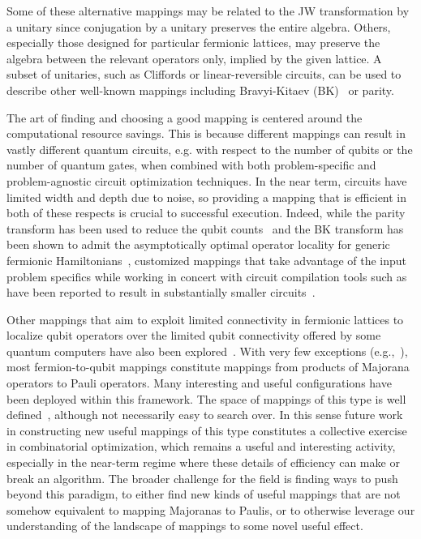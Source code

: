 Some of these alternative mappings may be related to the JW transformation by a unitary since conjugation by a unitary preserves the entire algebra. Others, especially those designed for particular fermionic lattices, may preserve the algebra between the relevant operators only, implied by the given lattice.
A subset of unitaries, such as Cliffords or linear-reversible circuits, can be used to describe other well-known mappings including Bravyi-Kitaev (BK)~\cite{bravyi2002fermionic} or parity. 


The art of finding and choosing a good mapping is centered around the computational resource savings.
This is because different mappings can result in vastly different quantum circuits, e.g. with respect to the number of qubits or the number of quantum gates, when combined with both problem-specific and problem-agnostic circuit optimization techniques.
In the near term, circuits have limited width and depth due to noise, so providing a mapping that is efficient in both of these respects is crucial to successful execution.
Indeed, while the parity transform has been used to reduce the qubit counts~\cite{bravyi2017tapering} and the BK transform has been shown to admit the asymptotically optimal operator locality for generic fermionic Hamiltonians~\cite{bravyi2002fermionic}, customized mappings that take advantage of the input problem specifics while working in concert with circuit compilation tools such as~\cite{nam2018automated,nam2020trappedion} have been reported to result in substantially smaller circuits~\cite{wang2021resource,wang2023ever}.

Other mappings that aim to exploit limited connectivity in fermionic lattices to localize qubit operators over the limited qubit connectivity offered by some quantum computers have also been explored~\cite{wang2021resource,derby2021compact,derby2021alternative,miller2023bonsai,chien2022optimizing,chen2023equivalence}.
With very few exceptions (e.g.,~\cite{kirby2022fermiontoqubit}), most fermion-to-qubit mappings constitute mappings from products of Majorana operators to Pauli operators.
Many interesting and useful configurations have been deployed within this framework.
The space of mappings of this type is well defined~\cite{chien2022optimizing}, although not necessarily easy to search over.
In this sense future work in constructing new useful mappings of this type constitutes a collective exercise in combinatorial optimization, which remains a useful and interesting activity, especially in the near-term regime where these details of efficiency can make or break an algorithm.
The broader challenge for the field is finding ways to push beyond this paradigm, to either find new kinds of useful mappings that are not somehow equivalent to mapping Majoranas to Paulis, or to otherwise leverage our understanding of the landscape of mappings to some novel useful effect.


